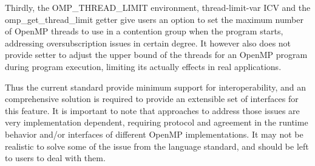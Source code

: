 Thirdly, the {\sf OMP\_THREAD\_LIMIT} environment, {\sf thread-limit-var} ICV and the {\sf omp\_get\_thread\_limit} getter give users an option to  
 set the maximum number of OpenMP threads to use in a contention group when the program starts, addressing oversubscription issues in certain
 degree. It however also does not provide setter to adjust the upper bound of the threads for an OpenMP program during program execution, limiting
 its actually effects in real applications. 



Thus the current standard provide minimum support for interoperability, and an comprehensive solution is required to 
provide an extensible set of interfaces for this feature. 
It is important to note that approaches to address those issues are very implementation
dependent, requiring protocol and agreement in the runtime behavior and/or interfaces 
of different OpenMP implementations. It may not be realistic to solve some of the issue
from the language standard, and should be left to users to deal with them. 



